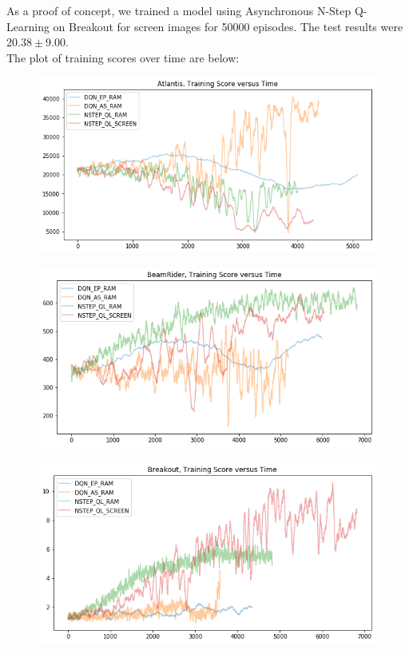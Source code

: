 \documentclass[11pt]{article}
\begin{document}
\noindent As a proof of concept, we trained a model using Asynchronous N-Step Q-Learning on Breakout for screen images for 50000 episodes. The test results were $20.38 \pm 9.00$. \\

\noindent The plot of training scores over time are below:
\begin{figure}[H]
    \centering
    \includegraphics[scale=0.6]{atlplot}
\end{figure}
\begin{figure}[H]
    \centering
    \includegraphics[scale=0.6]{bmrplot}
    \label{fig:my_label}
\end{figure}
\begin{figure}[H]
    \centering
    \includegraphics[scale=0.6]{brkplot}
\end{figure}
\end{document}
